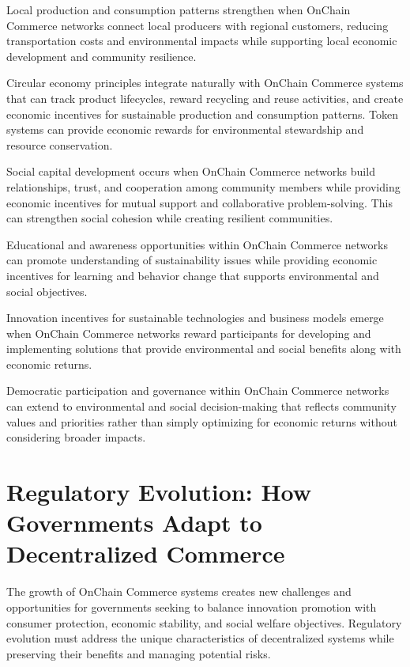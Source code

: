 \documentclass[
  Letterpaper,
]{scrbook}
\begin{document}
Local production and consumption patterns strengthen when OnChain
Commerce networks connect local producers with regional customers,
reducing transportation costs and environmental impacts while supporting
local economic development and community resilience.

Circular economy principles integrate naturally with OnChain Commerce
systems that can track product lifecycles, reward recycling and reuse
activities, and create economic incentives for sustainable production
and consumption patterns. Token systems can provide economic rewards for
environmental stewardship and resource conservation.

Social capital development occurs when OnChain Commerce networks build
relationships, trust, and cooperation among community members while
providing economic incentives for mutual support and collaborative
problem-solving. This can strengthen social cohesion while creating
resilient communities.

Educational and awareness opportunities within OnChain Commerce networks
can promote understanding of sustainability issues while providing
economic incentives for learning and behavior change that supports
environmental and social objectives.

Innovation incentives for sustainable technologies and business models
emerge when OnChain Commerce networks reward participants for developing
and implementing solutions that provide environmental and social
benefits along with economic returns.

Democratic participation and governance within OnChain Commerce networks
can extend to environmental and social decision-making that reflects
community values and priorities rather than simply optimizing for
economic returns without considering broader impacts.

\section{Regulatory Evolution: How Governments Adapt to Decentralized
Commerce}\label{regulatory-evolution-how-governments-adapt-to-decentralized-commerce}

The growth of OnChain Commerce systems creates new challenges and
opportunities for governments seeking to balance innovation promotion
with consumer protection, economic stability, and social welfare
objectives. Regulatory evolution must address the unique characteristics
of decentralized systems while preserving their benefits and managing
potential risks.
\end{document}
